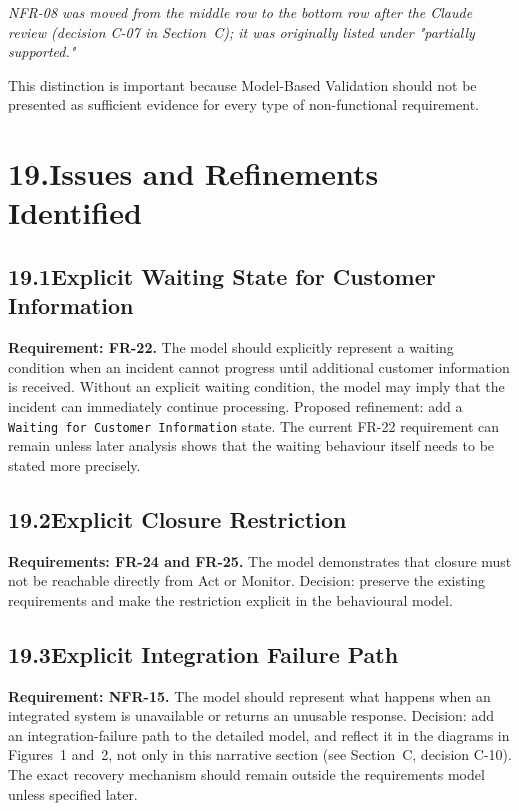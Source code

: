 \documentclass[11pt,a4paper]{article}
\begin{document}
\textit{NFR-08 was moved from the middle row to the bottom row after the Claude review (decision C-07 in Section~C); it was originally listed under "partially supported."}

This distinction is important because Model-Based Validation should not be presented as sufficient evidence for every type of non-functional requirement.

\section*{19.\enspace Issues and Refinements Identified}

\subsection*{19.1\enspace Explicit Waiting State for Customer Information}

\textbf{Requirement: FR-22.} The model should explicitly represent a waiting condition when an incident cannot progress until additional customer information is received. Without an explicit waiting condition, the model may imply that the incident can immediately continue processing. Proposed refinement: add a \texttt{Waiting for Customer Information} state. The current FR-22 requirement can remain unless later analysis shows that the waiting behaviour itself needs to be stated more precisely.

\subsection*{19.2\enspace Explicit Closure Restriction}

\textbf{Requirements: FR-24 and FR-25.} The model demonstrates that closure must not be reachable directly from Act or Monitor. Decision: preserve the existing requirements and make the restriction explicit in the behavioural model.

\subsection*{19.3\enspace Explicit Integration Failure Path}

\textbf{Requirement: NFR-15.} The model should represent what happens when an integrated system is unavailable or returns an unusable response. Decision: add an integration-failure path to the detailed model, and reflect it in the diagrams in Figures~1 and~2, not only in this narrative section (see Section~C, decision C-10). The exact recovery mechanism should remain outside the requirements model unless specified later.
\end{document}
